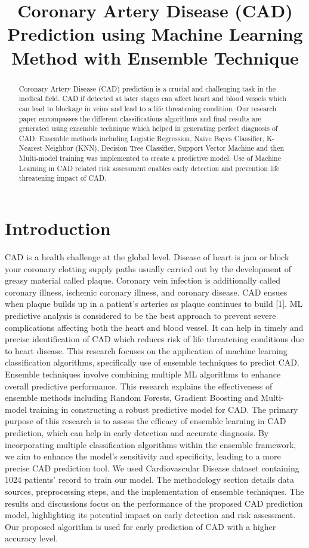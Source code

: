 \documentclass[journal, twoside, final]{IEEEtran}
\title{Coronary Artery Disease (CAD) Prediction using Machine Learning Method with Ensemble Technique}
\author{
  \IEEEauthorblockN{Waqas Mehmood\IEEEauthorrefmark{1}\thanks{Capital University of Science and Technology, waaqasmehmood@gmail.com}} 
  \and
  \IEEEauthorblockN{Abdul Khaliq\IEEEauthorrefmark{2}\thanks{Capital University of Science and Technology, engg.abdulkhaliq@gmail.com}}
}
\begin{document}
\maketitle

\begin{abstract}
Coronary Artery Disease (CAD) prediction is a crucial and challenging task in the medical field. CAD if detected at later stages can affect heart and blood vessels which can lead to blockage in veins and lead to a life threatening condition.  Our research paper encompasses the different classifications algorithms and final results are generated using ensemble technique which helped in generating perfect diagnosis of CAD. Ensemble methods including Logistic Regression, Naive Bayes Classifier, K-Nearest Neighbor (KNN), Decision Tree Classifier, Support Vector Machine and then Multi-model training was implemented to create a predictive model. Use of Machine Learning in CAD related risk assessment enables early detection and prevention life threatening impact of CAD.
\end{abstract}

\section{Introduction}
CAD is a health challenge at the global level. Disease of heart is jam or block your coronary clotting supply paths usually carried out by the development of greasy material called plaque. Coronary vein infection is additionally called coronary illness, ischemic coronary illness, and coronary disease. CAD ensues when plaque builds up in a patient's arteries as plaque continues to build [1].
ML predictive analysis is considered to be the best approach to prevent severe complications affecting both the heart and blood vessel. It can help in timely and precise identification of CAD which reduces risk of life threatening conditions due to heart disease. This research focuses on the application of machine learning classification algorithms, specifically use of ensemble techniques to predict CAD.
Ensemble techniques involve combining multiple ML algorithms to enhance overall predictive performance. This research explains the effectiveness of ensemble methods including Random Forests, Gradient Boosting and Multi-model training in constructing a robust predictive model for CAD. 
The primary purpose of this research is to assess the efficacy of ensemble learning in CAD prediction, which can help in early detection and accurate diagnosis. By incorporating multiple classification algorithms within the ensemble framework, we aim to enhance the model's sensitivity and specificity, leading to a more precise CAD prediction tool.
We used Cardiovascular Disease dataset containing 1024 patients’ record to train our model. The methodology section details data sources, preprocessing steps, and the implementation of ensemble techniques. The results and discussions focus on the performance of the proposed CAD prediction model, highlighting its potential impact on early detection and risk assessment. Our proposed algorithm is used for early prediction of CAD with a higher accuracy level.
\end{document}
